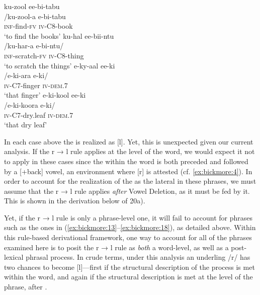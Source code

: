 \documentclass[output=paper
,newtxmath
,modfonts
,nonflat]{langsci/langscibook}
\begin{document}
\ea\label{ex:bickmore:20}
\ea\label{ex:bickmore:20a}
\glll ku-zool ee-bi-tabu\\
      /ku-zool-a e-bi-tabu    \\
\textsc{inf-}\textup{find}\textsc{{}-fv} \textsc{iv-C8-}\textup{book}\\
\glt      ‘to find the books’
\ex\label{ex:bickmore:20b}
\glll  ku-hal ee-bii-ntu    \\
      /ku-har-a e-bi-ntu/	\\
\textsc{inf-}\textup{scratch}\textsc{{}-fv} \textsc{iv-C8-}\textup{thing}\\
\glt      ‘to scratch the things’
\ex\label{ex:bickmore:20c}
\glll e-ky-aal ee-ki    \\
      /e-ki-ara e-ki/	\\
\textsc{iv-C7-}\textup{finger} \textsc{iv-dem.7}\\
\glt      ‘that finger’
\ex\label{ex:bickmore:20d}
\glll e-ki-kool ee-ki    \\
      /e-ki-koora e-ki/	\\
\textsc{iv-C7-}\textup{dry.leaf} \textsc{iv-dem.7}\\
\glt      ‘that dry leaf’
\z
\z

In each case above the  is realized as [l]. Yet, this is unexpected given our current analysis. If the r → l rule applies at the level of the word, we would expect it not to apply in these cases since the  within the word is both preceded and followed by a [+back] vowel, an environment where [r] is attested (cf. \ref{ex:bickmore:4}). In order to account for the realization of the  as the lateral in these phrases, we must assume that the r → l rule applies \textit{after} Vowel Deletion, as it must be fed by it. This is shown in the derivation below of 20a). 

\ea\label{ex:bickmore:21}
\z

Yet, if the r → l rule is only a phrase-level one, it will fail to account for phrases such as the ones in (\ref{ex:bickmore:13}--\ref{ex:bickmore:18}), as detailed above. Within this rule-based derivational framework, one way to account for all of the phrases examined here is to posit the r → l rule as \textit{both} a word-level, as well as a post-lexical phrasal process.%
%
 In crude terms, under this analysis an underling /r/ has two chances to become [l]—first if the structural description of the process is met within the word, and again if the structural description is met at the level of the phrase, after . 
\end{document}
